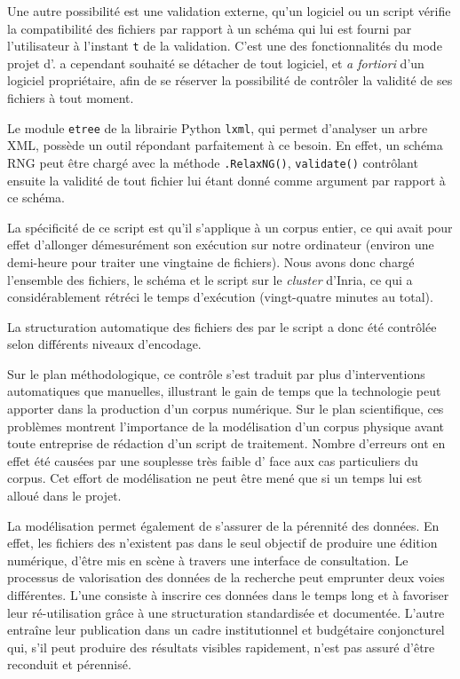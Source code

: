 Une autre possibilité est une validation externe, \cad{} qu'un logiciel ou un script vérifie la compatibilité des fichiers par rapport à un schéma qui lui est fourni par l'utilisateur à l'instant \texttt{t} de la validation. C'est une des fonctionnalités du mode \og projet \fg{} d'\oxygen. \timeus{} a cependant souhaité se détacher de tout logiciel, et \textit{a fortiori} d'un logiciel propriétaire, afin de se réserver la possibilité de contrôler la validité de ses fichiers à tout moment.

Le module \texttt{etree} de la librairie Python \texttt{lxml}, qui permet d'analyser un arbre XML, possède un outil répondant parfaitement à ce besoin. En effet, un schéma RNG peut être chargé avec la méthode \texttt{.RelaxNG()}, \texttt{validate()} contrôlant ensuite la validité de tout fichier lui étant donné comme argument par rapport à ce schéma.

La spécificité de ce script est qu'il s'applique à un corpus entier, ce qui avait pour effet d'allonger démesurément son exécution sur notre ordinateur (environ une demi-heure pour traiter une vingtaine de fichiers). Nous avons donc chargé l'ensemble des fichiers, le schéma et le script sur le \textit{cluster} \rioc{} d'Inria, ce qui a considérablement rétréci le temps d'exécution  (vingt-quatre minutes au total).

\clearpage


La structuration automatique des fichiers des \odm{} par le script \lse{} a donc été contrôlée selon différents niveaux d'encodage.

Sur le plan méthodologique, ce contrôle s'est traduit par plus d'interventions automatiques que manuelles, illustrant le gain de temps que la technologie peut apporter dans la production d'un corpus numérique. Sur le plan scientifique, ces problèmes montrent l'importance de la modélisation d'un corpus physique avant toute entreprise de rédaction d'un script de traitement. Nombre d'erreurs ont en effet été causées par une souplesse très faible d'\lse{} face aux cas particuliers du corpus. Cet effort de modélisation ne peut être mené que si un temps lui est alloué dans le projet.

La modélisation permet également de s'assurer de la pérennité des données. En effet, les fichiers des \odm{} n'existent pas dans le seul objectif de produire une édition numérique, \cad{} d'être mis en scène à travers une interface de consultation. Le processus de valorisation des données de la recherche peut emprunter deux voies différentes. L'une consiste à inscrire ces données dans le temps long et à favoriser leur ré-utilisation grâce à une structuration standardisée et documentée. L'autre entraîne leur publication dans un cadre institutionnel et budgétaire conjoncturel qui, s'il peut produire des résultats visibles rapidement, n'est pas assuré d'être reconduit et pérennisé.

